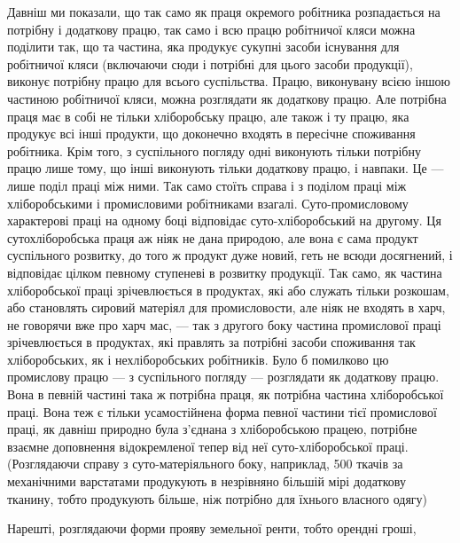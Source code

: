 Давніш ми показали, що так само як праця окремого робітника розпадається
на потрібну і додаткову працю, так само і всю працю робітничої кляси можна
поділити так, що та частина, яка продукує сукупні засоби існування для робітничої
кляси (включаючи сюди і потрібні для цього засоби продукції), виконує потрібну
працю для всього суспільства. Працю, виконувану всією іншою частиною
робітничої кляси, можна розглядати як додаткову працю. Але потрібна праця
має в собі не тільки хліборобську працю, але також і ту працю, яка продукує
всі інші продукти, що доконечно входять в пересічне споживання робітника.
Крім того, з суспільного погляду одні виконують тільки потрібну працю лише
тому, що інші виконують тільки додаткову працю, і навпаки. Це — лише
поділ праці між ними. Так само стоїть справа і з поділом праці між хліборобськими
і промисловими робітниками взагалі. Суто-промисловому характерові
праці на одному боці відповідає суто-хліборобський на другому. Ця сутохліборобська
праця аж ніяк не дана природою, але вона є сама продукт
суспільного розвитку, до того ж продукт дуже новий, геть не всюди досягнений,
і відповідає цілком певному ступеневі в розвитку продукції. Так само, як частина
хліборобської праці зрічевлюється в продуктах, які або служать тільки розкошам,
або становлять сировий матеріял для промисловости, але ніяк не входять
в харч, не говорячи вже про харч мас, — так з другого боку частина промислової
праці зрічевлюється в продуктах, які правлять за потрібні засоби споживання
так хліборобських, як і нехліборобських робітників. Було б помилково цю
промислову працю — з суспільного погляду — розглядати як додаткову працю. Вона
в певній частині така ж потрібна праця, як потрібна частина хліборобської
праці. Вона теж є тільки усамостійнена форма певної частини тієї промислової
праці, як давніш природно була з’єднана з хліборобською працею, потрібне взаємне
доповнення відокремленої тепер від неї суто-хліборобської праці. (Розглядаючи
справу з суто-матеріяльного боку, наприклад, 500 ткачів за механічними
варстатами продукують в незрівняно більшій мірі додаткову тканину, тобто
продукують більше, ніж потрібно для їхнього власного одягу)

Нарешті, розглядаючи форми прояву земельної ренти, тобто орендні гроші,
\parbreak{}  %

